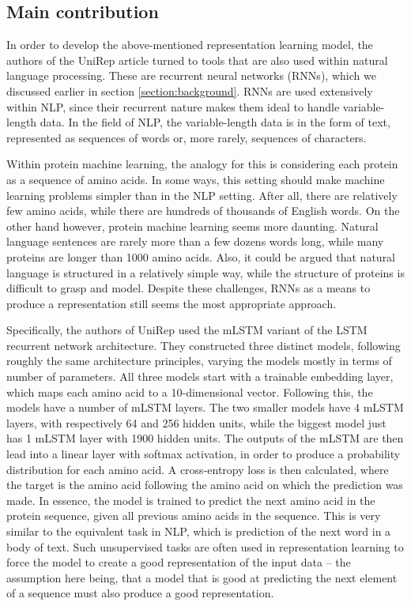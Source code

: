 \documentclass[a4paper,12pt]{article}
\begin{document}
\subsection{Main contribution}
In order to develop the above-mentioned representation learning model, the authors of the UniRep article turned to tools that are also used within natural language processing. These are recurrent neural networks (RNNs), which we discussed earlier in section \ref{section:background}. RNNs are used extensively within NLP, since their recurrent nature makes them ideal to handle variable-length data. In the field of NLP, the variable-length data is in the form of text, represented as sequences of words or, more rarely, sequences of characters.

Within protein machine learning, the analogy for this is considering each protein as a sequence of amino acids. In some ways, this setting should make machine learning problems simpler than in the NLP setting. After all, there are relatively few amino acids, while there are hundreds of thousands of English words. On the other hand however, protein machine learning seems more daunting. Natural language sentences are rarely more than a few dozens words long, while many proteins are longer than 1000 amino acids. Also, it could be argued that natural language is structured in a relatively simple way, while the structure of proteins is difficult to grasp and model. Despite these challenges, RNNs as a means to produce a representation still seems the most appropriate approach.

Specifically, the authors of UniRep used the mLSTM variant of the LSTM recurrent network architecture. They constructed three distinct models, following roughly the same architecture principles, varying the models mostly in terms of number of parameters. All three models start with a trainable embedding layer, which maps each amino acid to a 10-dimensional vector. Following this, the models have a number of mLSTM layers. The two smaller models have 4 mLSTM layers, with respectively 64 and 256 hidden units, while the biggest model just has 1 mLSTM layer with 1900 hidden units. The outputs of the mLSTM are then lead into a linear layer with softmax activation, in order to produce a probability distribution for each amino acid. A cross-entropy loss is then calculated, where the target is the amino acid following the amino acid on which the prediction was made. In essence, the model is trained to predict the next amino acid in the protein sequence, given all previous amino acids in the sequence. This is very similar to the equivalent task in NLP, which is prediction of the next word in a body of text. Such unsupervised tasks are often used in representation learning to force the model to create a good representation of the input data -- the assumption here being, that a model that is good at predicting the next element of a sequence must also produce a good representation.
\end{document}
